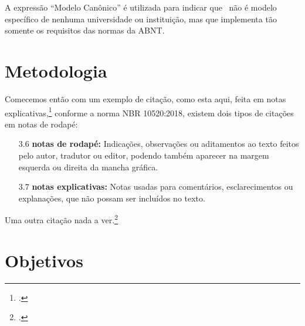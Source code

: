 \documentclass[
	12pt,				%
	openright,			%
	twoside,			%
	a4paper,			%
	english,			%
	brazil				%
	]{abntex2}
\begin{document}
A expressão ``Modelo Canônico'' é utilizada para indicar que \abnTeX\ não é modelo específico de nenhuma universidade ou instituição, mas que implementa tão somente os requisitos das normas da ABNT.

\section{Metodologia}
Comecemos então com um exemplo de citação, como esta aqui, feita em notas explicativas,\footcite[Esta é uma nota explicativa. Cf. e.g.,][\S 12]{boyle1772} conforme a norma NBR 10520:2018, existem dois tipos de citações em notas de rodapé:
\begin{citacao}
	\begin{itemize}
		\item[$3.6$] \textbf{notas de rodapé:} Indicações, observações ou aditamentos ao texto feitos pelo autor, tradutor ou editor, podendo	também aparecer na margem esquerda ou direita da mancha gráfica.
		\item[$3.7$] \textbf{notas explicativas:} Notas usadas para comentários, esclarecimentos ou explanações, que não possam ser incluídos no texto.
	\end{itemize}
\end{citacao}


Uma outra citação nada a ver.\footcite[Esta é uma outra nota explicativa. Ver também ][p.~12]{herao}


\lipsum[1]

\section{Objetivos}

\lipsum[7]
\end{document}
